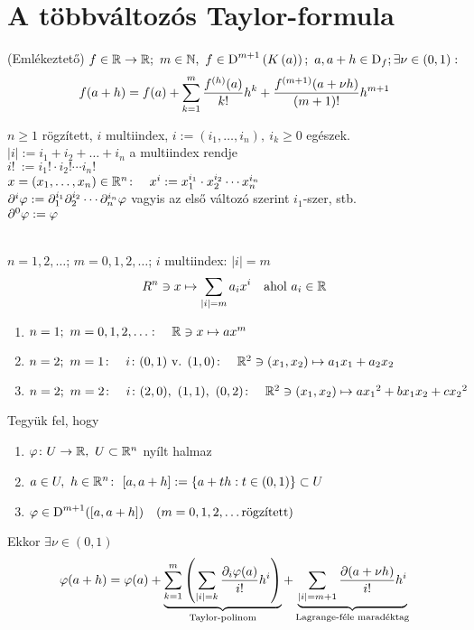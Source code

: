 \newpage
\section{A többváltozós Taylor-formula}
\begin{te}(Emlékeztető)
  $f\in\R\n\R;\ m\in\N,\ f\in\D^{m+1}\left(K\left(a\right)\right);\ a,a+h\in\D_f;\\\exists \nu\in(0,1):$
  \[\displaystyle f(a+h) = f(a) + \sum_{k=1}^m\dfrac{f^{(h)}(a)}{k!}h^k + \dfrac{f^{(m+1)}(a+\nu h)}{(m+1)!}h^{m+1}\]  
\end{te}

\begin{de}[Multiindex] $n\geq 1$ rögzített, $i$ multiindex, $i:=(i_1,\dotsc,i_n),\ i_k\geq 0$ egészek.\\
  $|i| := i_1 + i_2 + \ldots + i_n$ a multiindex rendje\\
  $i!~ := i_1! \cdot i_2! \dotsm i_n!$\\
  $x=(x_1,\dotsc,x_n)\in\mathbb{R}^n\colon\quad x^i := x_1^{i_1}\cdot x_2^{i_2}\dotsm x_n^{i_n}$\\
  $\partial^i\varphi := \partial_1^{i_1}\partial_2^{i_2}\dotsb\partial_n^{i_n}\varphi$ vagyis az első változó szerint
  $i_1$-szer, stb.\\
  $\partial^0\varphi :=  \varphi$
\end{de}

\begin{de} \ \\$n=1,2,\dotsc$; $m=0,1,2,\dotsc$; $i$ multiindex: $|i|=m$
  \[R^n\owns x\mapsto \sum_{|i|=m}a_ix^i\quad \text{ahol }a_i\in\mathbb{R}\]  
\end{de}

\begin{spec}{\listazjromai\begin{enumerate}
  \item $n=1;\ m=0,1,2,\dotsc\colon\quad \mathbb{R}\owns x\mapsto ax^m$
  \item $n=2;\ m=1\colon\quad i\colon (0,1) \text { v. }(1,0)\colon\quad \mathbb{R}^2\owns(x_1,x_2)\mapsto a_1x_1+a_2x_2$
  \item $n=2;\ m=2\colon\quad i\colon (2,0),\ (1,1),\ (0,2)\colon\quad \R^2\owns(x_1,x_2)\mapsto a{x_1}^2+bx_1x_2 +
    c{x_2}^2$    
  \end{enumerate} }
\end{spec}

\begin{te}Tegyük fel, hogy
  {\listazjbetu \begin{enumerate}
    \item $\vfi\colon U\n\R,\ U\subset\R^n$ nyílt halmaz
    \item $a\in U,\ h\in\mathbb{R}^n\colon\ [a,a+h] := \{a+th:t\in(0,1)\}\subset U$
    \item $\varphi\in\operatorname{D}^{m+1}([a,a+h])\quad(m=0,1,2,\dotsc\text{rögzített})$
  \end{enumerate} }
  Ekkor $\exists \nu\in(0,1)$
  \[ \displaystyle\varphi(a+h) = \varphi(a) + \underbrace{\sum_{k=1}^m\left(\sum_{|i|=k}\dfrac{\partial_i\varphi(a)}{i!}h^i\right)}
  _{\text{Taylor-polinom}} + \underbrace{\sum_{|i|=m+1}\dfrac{\partial(a+\nu h)}{i!}h^i}
  _{\text{Lagrange-féle maradéktag}}\]  
\end{te}


